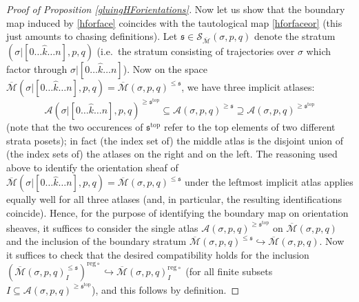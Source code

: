 \documentclass[12pt]{article}
\theoremstyle{definition}
\theoremstyle{remark}
\numberwithin{equation}{subsection}
\newcommand{\s}{\mathfrak s}
\newcommand{\SSS}{\mathcal S}
\newcommand{\ttop}{\mathrm{top}}
\newcommand{\A}{\mathcal A}
\newcommand{\Mbar}{\overline{\mathcal M}}
\newcommand{\reg}{\mathrm{reg}}
\begin{document}
\begin{proof}[Proof of Proposition \ref{gluingHForientations}]
Now let us show that the boundary map induced by \eqref{hforface} coincides with the tautological map \eqref{hforfaceor} (this just amounts to chasing definitions).  Let $\s\in\SSS_{\Mbar}(\sigma,p,q)$ denote the stratum $(\sigma|[0\ldots\hat k\ldots n],p,q)$ (i.e.\ the stratum consisting of trajectories over $\sigma$ which factor through $\sigma|[0\ldots\hat k\ldots n]$).  Now on the space $\Mbar(\sigma|[0\ldots\hat k\ldots n],p,q)=\Mbar(\sigma,p,q)^{\leq\s}$, we have three implicit atlases:
\begin{equation}
\A(\sigma|[0\ldots\hat k\ldots n],p,q)^{\geq\s^\ttop}\subseteq\A(\sigma,p,q)^{\geq\s}\supseteq\A(\sigma,p,q)^{\geq\s^\ttop}
\end{equation}
(note that the two occurences of $\s^\ttop$ refer to the top elements of two different strata posets); in fact (the index set of) the middle atlas is the disjoint union of (the index sets of) the atlases on the right and on the left.  The reasoning used above to identify the orientation sheaf of $\Mbar(\sigma|[0\ldots\hat k\ldots n],p,q)=\Mbar(\sigma,p,q)^{\leq\s}$ under the leftmost implicit atlas applies equally well for all three atlases (and, in particular, the resulting identifications coincide).  Hence, for the purpose of identifying the boundary map on orientation sheaves, it suffices to consider the single atlas $\A(\sigma,p,q)^{\geq\s^\ttop}$ on $\Mbar(\sigma,p,q)$ and the inclusion of the boundary stratum $\Mbar(\sigma,p,q)^{\leq\s}\hookrightarrow\Mbar(\sigma,p,q)$.  Now it suffices to check that the desired compatibility holds for the inclusion $(\Mbar(\sigma,p,q)^{\leq\s}_I)^{\reg\circ}\hookrightarrow\Mbar(\sigma,p,q)_I^{\reg\circ}$ (for all finite subsets $I\subseteq\A(\sigma,p,q)^{\geq\s^\ttop}$), and this follows by definition.


\end{proof}
\end{document}

